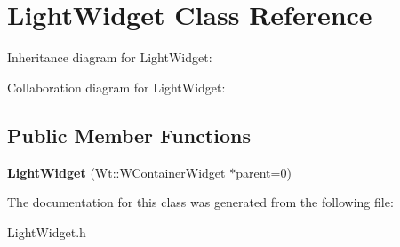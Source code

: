 \hypertarget{classLightWidget}{}\section{Light\+Widget Class Reference}
\label{classLightWidget}


Inheritance diagram for Light\+Widget\+:


Collaboration diagram for Light\+Widget\+:
\subsection*{Public Member Functions}
\begin{DoxyCompactItemize}
\item 
\mbox{\label{classLightWidget_a87ab7804d0e2861c49f70d6633446824}} 
{\bfseries Light\+Widget} (Wt\+::\+W\+Container\+Widget $\ast$parent=0)
\end{DoxyCompactItemize}


The documentation for this class was generated from the following file\+:\begin{DoxyCompactItemize}
\item 
Light\+Widget.\+h\end{DoxyCompactItemize}
